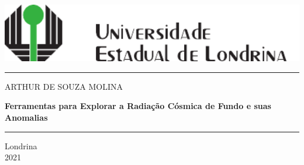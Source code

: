 \documentclass[12pt,a4paper,oneside,brazil]{abntex2}
\theoremstyle{definition}
\numberwithin{defin}{section}
\numberwithin{thm}{section}
\numberwithin{notation}{section}
\theoremstyle{remark}
\numberwithin{exmp}{section}
\numberwithin{p}{section}
\numberwithin{lema}{section}
\begin{document}
	
	\thispagestyle{empty}
	\begin{center}
		\includegraphics[width=14.8cm]{figuras/logo} 
		\par\end{center}
	
	\begin{center}
		{\color{green!45!black} \rule{1\columnwidth}{1.5mm}}
		\par\end{center}
	
	\begin{center}
		\medskip{}
		\par\end{center}
	
	\begin{center}
		{\Large{}ARTHUR DE SOUZA MOLINA}
		\par\end{center}{\Large \par}
	
	\begin{center}
		\vfill{}
		\par\end{center}
	
	\begin{DoubleSpace}
		\begin{center}
			\textbf{\Large{}Ferramentas para Explorar
				a Radiação Cósmica de Fundo e suas Anomalias}
			\par\end{center}{\Large \par}
	\end{DoubleSpace}
	
	\begin{center}
		\vfill{}
		\par\end{center}
	
	\begin{center}
		{\color{green!45!black} \rule{1\columnwidth}{1.5mm}}
		\par\end{center}
	
	\begin{center}
		Londrina \\
		2021
		\par\end{center}
	
\end{document}
